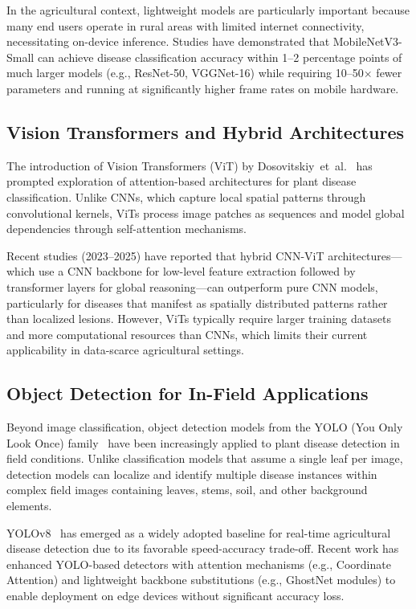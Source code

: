 \documentclass[journal]{IEEEtran}
\begin{document}
In the agricultural context, lightweight models are particularly important because many end users operate in rural areas with limited internet connectivity, necessitating on-device inference. Studies have demonstrated that MobileNetV3-Small can achieve disease classification accuracy within 1--2 percentage points of much larger models (e.g., ResNet-50, VGGNet-16) while requiring 10--50$\times$ fewer parameters and running at significantly higher frame rates on mobile hardware.

\subsection{Vision Transformers and Hybrid Architectures}

The introduction of Vision Transformers (ViT) by Dosovitskiy~et~al.~\cite{dosovitskiy2021image} has prompted exploration of attention-based architectures for plant disease classification. Unlike CNNs, which capture local spatial patterns through convolutional kernels, ViTs process image patches as sequences and model global dependencies through self-attention mechanisms.

Recent studies (2023--2025) have reported that hybrid CNN-ViT architectures---which use a CNN backbone for low-level feature extraction followed by transformer layers for global reasoning---can outperform pure CNN models, particularly for diseases that manifest as spatially distributed patterns rather than localized lesions. However, ViTs typically require larger training datasets and more computational resources than CNNs, which limits their current applicability in data-scarce agricultural settings.

\subsection{Object Detection for In-Field Applications}

Beyond image classification, object detection models from the YOLO (You Only Look Once) family~\cite{redmon2018yolov3,jocher2023yolov8} have been increasingly applied to plant disease detection in field conditions. Unlike classification models that assume a single leaf per image, detection models can localize and identify multiple disease instances within complex field images containing leaves, stems, soil, and other background elements.

YOLOv8~\cite{jocher2023yolov8} has emerged as a widely adopted baseline for real-time agricultural disease detection due to its favorable speed-accuracy trade-off. Recent work has enhanced YOLO-based detectors with attention mechanisms (e.g., Coordinate Attention) and lightweight backbone substitutions (e.g., GhostNet modules) to enable deployment on edge devices without significant accuracy loss.
\end{document}
